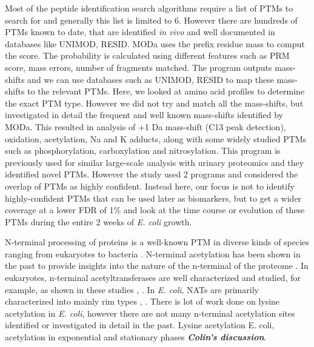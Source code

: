 \documentclass[12pt]{article}
\begin{document}
Most of the peptide identification search algorithms require a list of PTMs to search for and generally this list is limited to 6. However there are hundreds of PTMs known to date, that are identified \emph{in vivo} and well documented in databases like UNIMOD, RESID. MODa uses the prefix residue mass to comput the score. The probability is calculated using different features such as PRM score, mass errors, number of fragments matched. The program outputs mass-shifts and we can use databases such as UNIMOD, RESID to map these mass-shifts to the relevant PTMs. Here, we looked at amino acid profiles to determine the exact PTM type. However we did not try and match all the mass-shifts, but investigated in detail the frequent and well known mass-shifts identified by MODa. This resulted in analysis of +1 Da mass-shift (C13 peak detection), oxidation, acetylation, Na and K adducts, along with some widely studied PTMs such as phosphorylation, carboxylation and nitrosylation. This program is previously used for similar large-scale analysis with urinary proteomics and they identified novel PTMs. However the study used 2 programs and considered the overlap of PTMs as highly confident. Instead here, our focus is not to identify highly-confident PTMs that can be used later as biomarkers, but to get a wider coverage at a lower FDR of 1\% and look at the time course or evolution of these PTMs during the entire 2 weeks of \emph{E. coli} growth.

N-terminal processing of proteins is a well-known PTM in diverse kinds of species ranging from eukaryotes to bacteria \cite{Kimuraetal2003}. N-terminal acetylation has been shown in the past to provide insights into the nature of the n-terminal of the proteome \cite{Helbigetal2010}. In eukaryotes, n-terminal acetyltransferases are well characterized and studied, for example, as shown in these studies \cite{PolevodaSherman2003}, \cite{PolevodaSherman2003b}. In \emph{E. coli}, NATs are primarily characterized into mainly rim types \cite{Tanakaetal1989}, \cite{Yoshikawaetal1987}. There is lot of work done on lysine acetylation in \emph{E. coli}, however there are not many n-terminal acetylation sites identified or investigated in detail in the past. Lysine acetylation E. coli, acetylation in exponential and stationary phases \textbf{\emph{Colin's discussion}}. 
\end{document}
